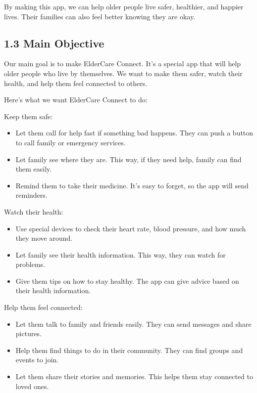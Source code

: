 \documentclass{article}
\begin{document}
By making this app, we can help older people live safer, healthier, and happier lives. Their families can also feel better knowing they are okay.

\subsection*{1.3 Main Objective}

Our main goal is to make ElderCare Connect. It's a special app that will help older people who live by themselves. We want to make them safer, watch their health, and help them feel connected to others.

Here's what we want ElderCare Connect to do:

Keep them safe:

\begin{itemize}
    \item Let them call for help fast if something bad happens. They can push a button to call family or emergency services.
    \item Let family see where they are. This way, if they need help, family can find them easily.
    \item Remind them to take their medicine. It's easy to forget, so the app will send reminders.
\end{itemize}

Watch their health:

\begin{itemize}
    \item Use special devices to check their heart rate, blood pressure, and how much they move around.
    \item Let family see their health information. This way, they can watch for problems.
    \item Give them tips on how to stay healthy. The app can give advice based on their health information.
\end{itemize}

Help them feel connected:

\begin{itemize}
    \item Let them talk to family and friends easily. They can send messages and share pictures.
    \item Help them find things to do in their community. They can find groups and events to join.
    \item Let them share their stories and memories. This helps them stay connected to loved ones.
\end{itemize}
\end{document}

